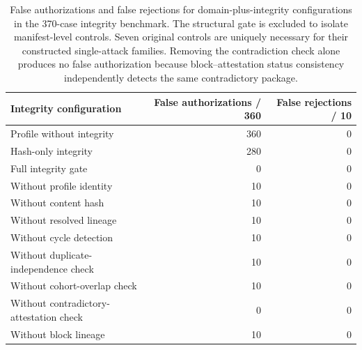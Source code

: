 \begin{table}[!htbp]
\centering
\caption{False authorizations and false rejections for domain-plus-integrity configurations in the 370-case integrity benchmark. The structural gate is excluded to isolate manifest-level controls. Seven original controls are uniquely necessary for their constructed single-attack families. Removing the contradiction check alone produces no false authorization because block--attestation status consistency independently detects the same contradictory package.}
\label{tab:integrity-ablation-v2}
\footnotesize
\renewcommand{\arraystretch}{1.05}
\begin{tabularx}{\textwidth}{@{}Y r r@{}}
\toprule
Integrity configuration & False authorizations / 360 & False rejections / 10 \\
\midrule
Profile without integrity & 360 & 0 \\
Hash-only integrity & 280 & 0 \\
Full integrity gate & 0 & 0 \\
Without profile identity & 10 & 0 \\
Without content hash & 10 & 0 \\
Without resolved lineage & 10 & 0 \\
Without cycle detection & 10 & 0 \\
Without duplicate-independence check & 10 & 0 \\
Without cohort-overlap check & 10 & 0 \\
Without contradictory-attestation check & 0 & 0 \\
Without block lineage & 10 & 0 \\
\bottomrule
\end{tabularx}
\end{table}
